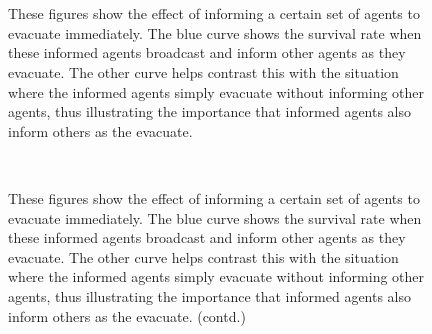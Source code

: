 \begin{figure}[!t]
\centering
    \hspace{1pt}
    \\
    \hspace{1pt}
    \\
    \hspace{1pt}
    \caption[Experiment 2: The effect of having informed occupants]{These figures show the effect of informing a certain set of agents to evacuate immediately. The blue curve shows the survival rate when these informed agents broadcast and inform other agents as they evacuate. The other curve helps contrast this with the situation where the informed agents simply evacuate without informing other agents, thus illustrating the importance that informed agents also inform others as the evacuate.}
    \label{fig:informed_vs_informing_1}
\end{figure}

\begin{figure}[!t]
\centering
    \hspace{1pt}
    \\
    \hspace{1pt}
    \caption[Experiment 2: The effect of having informed occupants (contd.)]{These figures show the effect of informing a certain set of agents to evacuate immediately. The blue curve shows the survival rate when these informed agents broadcast and inform other agents as they evacuate. The other curve helps contrast this with the situation where the informed agents simply evacuate without informing other agents, thus illustrating the importance that informed agents also inform others as the evacuate. (contd.)}
    \label{fig:informed_vs_informing_2}
\end{figure}

